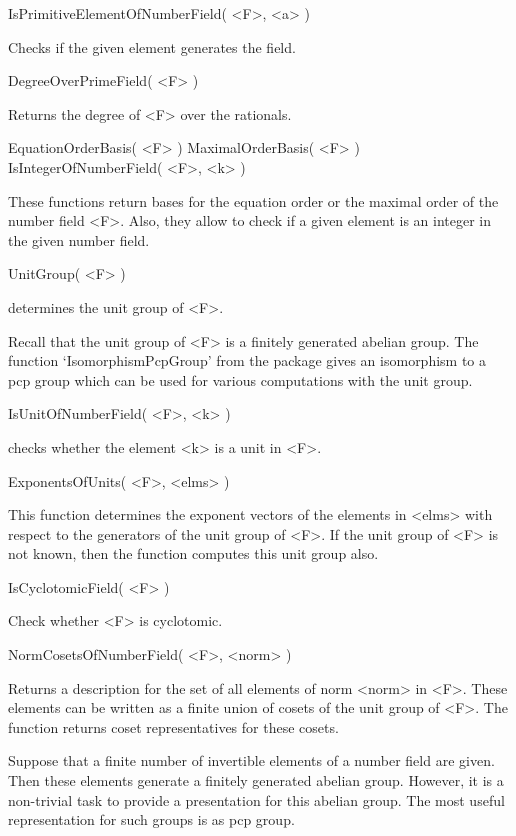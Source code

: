 \> IsPrimitiveElementOfNumberField( <F>, <a> )

Checks if the given element generates the field.

\> DegreeOverPrimeField( <F> )

Returns the degree of <F> over the rationals. 

\> EquationOrderBasis( <F> )
\> MaximalOrderBasis( <F> )
\> IsIntegerOfNumberField( <F>, <k> )

These functions return bases for the equation order or the maximal order
of the number field <F>. Also, they allow to check if a given element is
an integer in the given number field.

\> UnitGroup( <F> )

determines the unit group of <F>.

Recall that the unit group of <F> is a finitely generated abelian
group. The function `IsomorphismPcpGroup' from the {\Polycyclic}
\cite{Polycyclic} package gives an isomorphism to a pcp group which
can be used for various computations with the unit group. 

\> IsUnitOfNumberField( <F>, <k> )

checks whether the element <k> is a unit in <F>. 

\> ExponentsOfUnits( <F>, <elms> )

This function determines the exponent vectors of the elements in <elms>
with respect to the generators of the unit group of <F>. If the unit
group of <F> is not known, then the function computes this unit group also.

\> IsCyclotomicField( <F> )

Check whether <F> is cyclotomic.

\> NormCosetsOfNumberField( <F>, <norm> )

Returns a description for the set of all elements of norm <norm> in <F>. 
These elements can be written as a finite union of cosets of the unit
group of <F>. The function returns coset representatives for these cosets.


Suppose that a finite number of
invertible elements
of a number field are given. Then these elements generate a finitely
generated abelian group. However, it is a non-trivial task to provide
a presentation for this abelian group. The most useful representation
for such groups is as pcp group.

